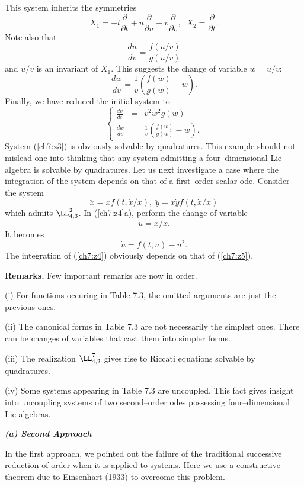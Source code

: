 This system inherits the symmetries
\[X_1=-t\frac{\partial}{\partial t}+u\frac{\partial}{\partial u } +
v\frac{\partial}{\partial v},\;\; X_2=\frac{\partial}{\partial t}.\]
Note also that
\[\frac{du}{dv}=\frac{f(u/v)}{g(u/v)}\]
and $u/v$ is an invariant of $X_1$. This suggests the change of variable
$w=u/v$:
\[\frac{dw}{dv}=\frac{1}{v}\left (\frac{f(w)}{g(w)}-w \right ).\]
Finally, we have reduced the initial system to 
\begin{equation}
\label{ch7:z3}
\left \{ \begin{array}{lll}
\displaystyle{\frac{dv}{dt}} &=&v^2w^2g(w)\\
\displaystyle{\frac{dw}{dv}} &= &
\displaystyle{\frac{1}{v}\left (\frac{f(w)}{g(w)}-w \right )}.
\end{array} \right.
\end{equation}
System (\ref{ch7:z3}) is obviously solvable by quadratures. This example
should  not mislead one into thinking that any system admitting a four--dimensional
Lie algebra is solvable by quadratures. Let us next investigate a case
where the integration of the system depends on that of a first--order scalar
ode. Consider the system
\begin{equation}
\label{ch7:z4}
\ddot x=xf(t,\dot x/x),\;\ddot y=x\dot yf(t,\dot x/x)
\end{equation}
which admits $\LL_{4,3}^2$.
In (\ref{ch7:z4}a), perform the change of variable
\[u=\dot x/x.\]
It becomes
\begin{equation}
\label{ch7:z5}
\dot u=f(t,u)-u^2.
\end{equation}
The integration of (\ref{ch7:z4}) obviously depends  on that of
(\ref{ch7:z5}).

{\bf Remarks.} Few important remarks are now in order.

(i) For functions occuring in Table 7.3, the omitted arguments are just the
previous ones.

(ii) The canonical  forms in Table 7.3 are not necessarily the simplest ones.
There can be changes of variables that cast them into simpler forms.

(iii) The realization $\LL_{4,2}^7$ gives rise to Riccati equations solvable
by quadratures.

(iv) Some systems appearing in Table 7.3 are uncoupled. This  fact
gives insight into uncoupling systems of two second--order odes possessing
four--dimensional Lie algebras.

{\bf \em  (a) Second Approach}

In the first approach, we pointed out the failure of the traditional successive
reduction of order when it is applied to systems. Here we use a
constructive theorem due to Einsenhart (1933) to overcome this problem.

